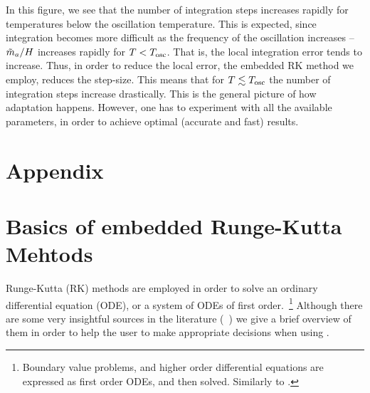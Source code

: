 \documentclass[11pt,a4paper]{article}
\renewcommand{\theequation}{\arabic{section}.\arabic{equation}}
\begin{document}
%
In this figure, we see that the number of integration steps increases rapidly for temperatures below the oscillation temperature. 
%
This is expected, since integration becomes more difficult as the frequency of the oscillation increases -- $\tilde m_{a}{}/H$ increases rapidly for $T<T_{\rm osc}{}$. That is, the local integration error tends to increase. Thus, in order to reduce the local error, the embedded RK method we employ, reduces the step-size. This means that for $T \lesssim T_{\rm osc}{}$ the number of integration steps increase drastically.
%
This is the general picture of how adaptation happens. However, one has to experiment with all the available parameters, in order to achieve optimal (\ie accurate and fast) results.  


\pagebreak
\setcounter{section}{0}
\section*{Appendix}
\appendix

\renewcommand{\theequation}{\Alph{section}.\arabic{equation}}
\setcounter{equation}{0}  %

\section{Basics of embedded Runge-Kutta Mehtods}\label{app:RK}
\setcounter{equation}{0}
%
Runge-Kutta (RK) methods are employed in order to solve an ordinary differential equation (ODE), or a system of ODEs of first order.~\footnote{Boundary value problems, and higher order differential equations are expressed as first order ODEs, and then solved. Similarly to  .}   Although there are some very insightful sources in the literature (\eg~\cite{Hairer,hairer2010solving,10.5555/1403886}) we give a brief overview of them in order to help the user to make appropriate decisions when using \mimes.
\end{document}
